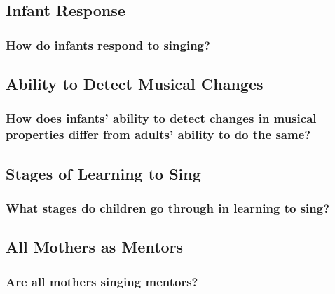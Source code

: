 \documentclass{beamer}
\begin{document}
\subsection*{Infant Response}

\begin{frame}
	\frametitle{How do infants respond to singing?}
\end{frame}

\subsection*{Ability to Detect Musical Changes}

\begin{frame}
	\frametitle{How does infants' ability to detect changes in musical properties differ from adults' ability to do the same?}
\end{frame}

\subsection*{Stages of Learning to Sing}

\begin{frame}
	\frametitle{What stages do children go through in learning to sing?}
\end{frame}

\subsection*{All Mothers as Mentors}
\begin{frame}
	\frametitle{Are all mothers singing mentors?}
\end{frame}

\end{document}
